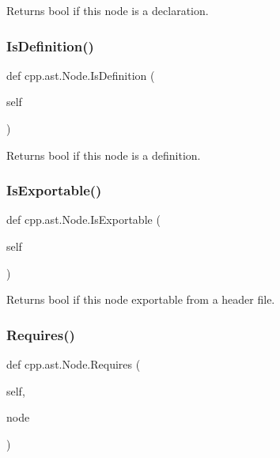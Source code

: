 \begin{DoxyVerb}Returns bool if this node is a declaration.\end{DoxyVerb}
 \mbox{\label{classcpp_1_1ast_1_1_node_a684ee9a357168e7e07a24fc6812f66e6}} 
\subsubsection{\texorpdfstring{Is\+Definition()}{IsDefinition()}}
{\footnotesize\ttfamily def cpp.\+ast.\+Node.\+Is\+Definition (\begin{DoxyParamCaption}\item[{}]{self }\end{DoxyParamCaption})}

\begin{DoxyVerb}Returns bool if this node is a definition.\end{DoxyVerb}
 \mbox{\label{classcpp_1_1ast_1_1_node_a313273874ccf578485006d4000128234}} 
\subsubsection{\texorpdfstring{Is\+Exportable()}{IsExportable()}}
{\footnotesize\ttfamily def cpp.\+ast.\+Node.\+Is\+Exportable (\begin{DoxyParamCaption}\item[{}]{self }\end{DoxyParamCaption})}

\begin{DoxyVerb}Returns bool if this node exportable from a header file.\end{DoxyVerb}
 \mbox{\label{classcpp_1_1ast_1_1_node_a31ae211f954a8c578ef16226df5ac8c8}} 
\subsubsection{\texorpdfstring{Requires()}{Requires()}}
{\footnotesize\ttfamily def cpp.\+ast.\+Node.\+Requires (\begin{DoxyParamCaption}\item[{}]{self,  }\item[{}]{node }\end{DoxyParamCaption})}

